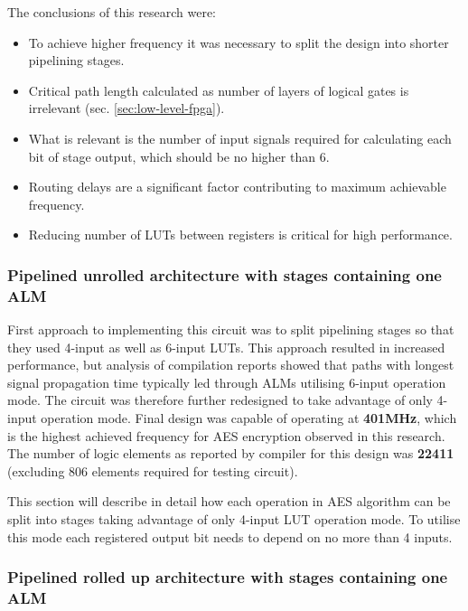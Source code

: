 The conclusions of this research were:
\begin{itemize}[noitemsep]
\item To achieve higher frequency it was necessary to split the design into shorter pipelining stages.
\item Critical path length calculated as number of layers of logical gates is irrelevant (sec. \ref{sec:low-level-fpga}).
\item What is relevant is the number of input signals required for calculating each bit of stage output, which should be no higher than 6.
\item Routing delays are a significant factor contributing to maximum achievable frequency.
\item Reducing number of LUTs between registers is critical for high performance.
\end{itemize}

\subsubsection{Pipelined unrolled architecture with stages containing one ALM}
\label{sec:implementation-pipe-unrolled-one-alm}

First approach to implementing this circuit was to split pipelining stages so that they used 4-input as well as 6-input LUTs. This approach resulted in increased performance, but analysis of compilation reports showed that paths with longest signal propagation time typically led through ALMs utilising 6-input operation mode. The circuit was therefore further redesigned to take advantage of only 4-input operation mode. Final design was capable of operating at \textbf{401MHz}, which is the highest achieved frequency for AES encryption observed in this research. The number of logic elements as reported by compiler for this design was \textbf{22411} (excluding 806 elements required for testing circuit).

This section will describe in detail how each operation in AES algorithm can be split into stages taking advantage of only 4-input LUT operation mode. To utilise this mode each registered output bit needs to depend on no more than 4 inputs.




\subsubsection{Pipelined rolled up architecture with stages containing one ALM}


